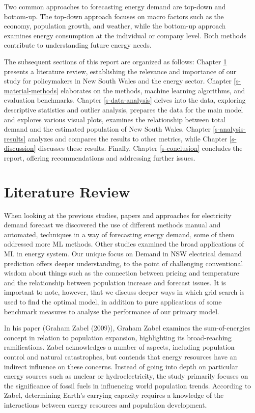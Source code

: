 \documentclass[mstat,12pt]{unswthesis}
\begin{document}
Two common approaches to forecasting energy demand are top-down and
bottom-up. The top-down approach focuses on macro factors such as the
economy, population growth, and weather, while the bottom-up approach
examines energy consumption at the individual or company level. Both
methods contribute to understanding future energy needs.

The subsequent sections of this report are organized as follows: Chapter
\ref{s-literature-review} presents a literature review, establishing the
relevance and importance of our study for policymakers in New South
Wales and the energy sector. Chapter \ref{s-material-methods} elaborates
on the methods, machine learning algorithms, and evaluation benchmarks.
Chapter \ref{s-data-analysis} delves into the data, exploring
descriptive statistics and outlier analysis, prepares the data for the
main model and explores various visual plots, examines the relationship
between total demand and the estimated population of New South Wales.
Chapter \ref{s-analysis-results} analyzes and compares the results to
other metrics, while Chapter \ref{s-discussion} discusses these results.
Finally, Chapter \ref{s-conclusion} concludes the report, offering
recommendations and addressing further issues.

\hypertarget{s-literature-review}{%
\chapter{Literature Review}\label{s-literature-review}}

When looking at the previous studies, papers and approaches for
electricity demand forecast we discovered the use of different methods
manual and automated, techniques in a way of forecasting energy demand,
some of them addressed more ML methods. Other studies examined the broad
applications of ML in energy system. Our unique focus on Demand in NSW
electrical demand prediction offers deeper understanding, to the point
of challenging conventional wisdom about things such as the connection
between pricing and temperature and the relationship between population
increase and forecast issues. It is important to note, however, that we
discuss deeper ways in which grid search is used to find the optimal
model, in addition to pure applications of some benchmark measures to
analyse the performance of our primary model.

In his paper (Graham Zabel (2009)), Graham Zabel examines the
sum-of-energies concept in relation to population expansion,
highlighting its broad-reaching ramifications. Zabel acknowledges a
number of aspects, including population control and natural
catastrophes, but contends that energy resources have an indirect
influence on these concerns. Instead of going into depth on particular
energy sources such as nuclear or hydroelectricity, the study primarily
focuses on the significance of fossil fuels in influencing world
population trends. According to Zabel, determining Earth's carrying
capacity requires a knowledge of the interactions between energy
resources and population development.
\end{document}
